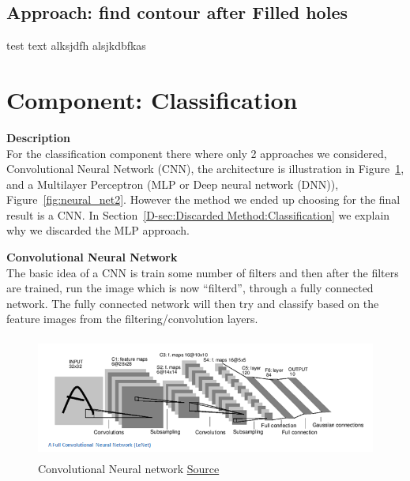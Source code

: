 \documentclass[Report.tex]{subfiles}
\begin{document}
\subsection{Approach: find contour after Filled holes}
test text alksjdfh alsjkdbfkas


\section{Component: Classification}
\label{Method:Classification}
\begin{flushleft}
  \textbf{Description} \\
  For the classification component there where only 2 approaches we considered,
  Convolutional Neural Network (CNN), the architecture is illustration in
  Figure~\ref{fig:CNN_architecture}, and a Multilayer Perceptron (MLP or Deep
  neural network (DNN)), Figure~\ref{fig:neural_net2}. However the method we
  ended up choosing for the final result is a CNN. In
  Section~\ref{D-sec:Discarded Method:Classification} we explain why we discarded
  the MLP approach.
\end{flushleft}

\begin{flushleft}
  \textbf{Convolutional Neural Network} \\
  The basic idea of a CNN is train some number of filters and then
  after the filters are trained, run the image which is now ``filterd'', through
  a fully connected network. The fully connected network will then try and
  classify based on the feature images from the filtering/convolution layers. \par
\end{flushleft}

\begin{figure}[H]
  \centering
  \includegraphics[height=4cm]{res/LeNet.png}
  \caption{Convolutional Neural network \href{https://adeshpande3.github.io/A-Beginner\%27s-Guide-To-Understanding-Convolutional-Neural-Networks/}{Source}}
  \label{fig:CNN_architecture}
\end{figure}
\end{document}
